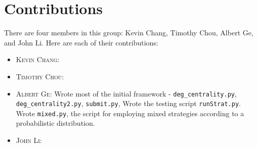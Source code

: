 \documentclass{article}
\begin{document}
 

\section{Contributions}
There are four members in this group: Kevin Chang, Timothy Chou, Albert Ge, and John Li. Here are each of their contributions:
\begin{itemize}
  \item \textsc{Kevin Chang}: 
  \item \textsc{Timothy Chou}: 
  \item \textsc{Albert Ge}: Wrote most of the initial framework - \texttt{deg\_centrality.py},
  \texttt{deg\_centrality2.py}, \texttt{submit.py}, 
  Wrote the testing script \texttt{runStrat.py}. 
  Wrote \texttt{mixed.py}, the script for employing mixed strategies according to
  a probabilistic distribution.
  \item \textsc{John Li}: 
 \end{itemize}




\end{document}
